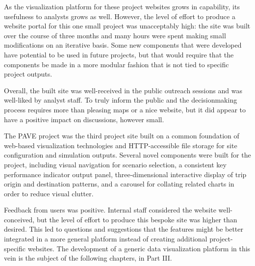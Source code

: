 As the visualization platform for these project websites grows in capability, its usefulness to analysts grows as well. However, the level of effort to produce a website portal for this one small project was unacceptably high: the site was built over the course of three months and many hours were spent making small modifications on an iterative basis. Some new components that were developed have potential to be used in future projects, but that would require that the components be made in a more modular fashion that is not tied to specific project outputs.

Overall, the built site was well-received in the public outreach sessions and was well-liked by analyst staff. To truly inform the public and the decisionmaking process requires more than pleasing maps or a nice website, but it did appear to have a positive impact on discussions, however small.

The PAVE project was the third project site built on a common foundation of web-based visualization technologies and HTTP-accessible file storage for site configuration and simulation outputs. Several novel components were built for the project, including visual navigation for scenario selection, a consistent key performance indicator output panel, three-dimensional interactive display of trip origin and destination patterns, and a carousel for collating related charts in order to reduce visual clutter.

Feedback from users was positive. Internal staff considered the website well-conceived, but the level of effort to produce this bespoke site was higher than desired. This led to questions and suggestions that the features might be better integrated in a more general platform instead of creating additional project-specific websites. The development of a generic data visualization platform in this vein is the subject of the following chapters, in Part III.
